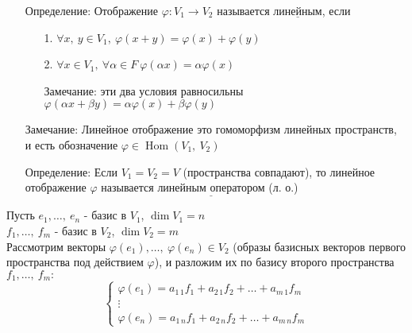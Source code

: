 \documentclass[12pt, letterpaper, twoside]{article}
\newcommand{\Underl}[1]{$\underline{\text{#1}}$}
\newcommand{\Hom}{\operatorname{Hom}}
\begin{document}
    \begin{enumerate}
        \item[Определение:] Отображение $\varphi: V_1\longrightarrow V_2$ называется \Underl{линейным}, если
        \begin{enumerate}
            \item[1.] $\forall x,\ y\in V_1,\ \varphi(x + y) = \varphi(x) + \varphi(y)$
            \item[2.] $\forall x\in V_1,\ \forall \alpha \in F\ \varphi(\alpha x) = \alpha \varphi(x)$
            \item[Замечание:] эти два условия равносильны $\varphi(\alpha x + \beta y) = \alpha \varphi(x) + \beta\varphi(y)$ 
        \end{enumerate}
        \item[Замечание:] Линейное отображение это гомоморфизм линейных пространств, и есть обозначение $\varphi\in \Hom(V_1,\ V_2)$
        \item[Определение:] Если $V_1 = V_2 = V$ (пространства совпадают), то линейное отображение $\varphi$ называется \Underl{линейным оператором} (л. о.) 
    \end{enumerate}
    Пусть $e_1,\dots,\ e_n$ - базис в $V_1$, $\dim V_1 = n$\\
    $f_1,\dots,\ f_m$ - базис в $V_2$, $\dim V_2 = m$\\
    Рассмотрим векторы $\varphi(e_1),\dots,\ \varphi(e_n)\in V_2$ (образы базисных векторов первого пространства под действием $\varphi$), и разложим их по базису второго пространства $f_1,\dots,\ f_m:$
    \[\begin{cases}
        \varphi(e_1) = a_{1\, 1}f_1 + a_{2\, 1}f_2 + \dots + a_{m\, 1} f_m\\
        \vdots\\
        \varphi(e_n) = a_{1\, n}f_1 + a_{2\, n}f_2 + \dots + a_{m\, n} f_m
    \end{cases}\]
\end{document}
